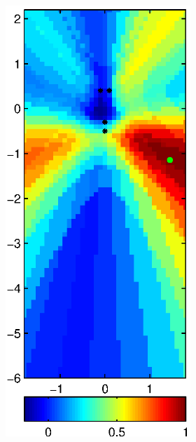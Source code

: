 \documentclass[spanish,openright]{book}
\begin{document}
\begin{figure}
\begin{subfigure}[t]{0.47\textwidth}
\begin{minipage}[t]{\textwidth}
\begin{subfigure}[t]{0.3\textwidth}
\label{fig:Pattern_Fo1500_pos01}
\end{subfigure}
\begin{subfigure}[t]{0.3\textwidth}
\includegraphics[width=\textwidth]{SRP_Fo1500_frame003_pos01}

\end{subfigure}
\end{minipage}
\end{subfigure}
\end{figure}
\end{document}
